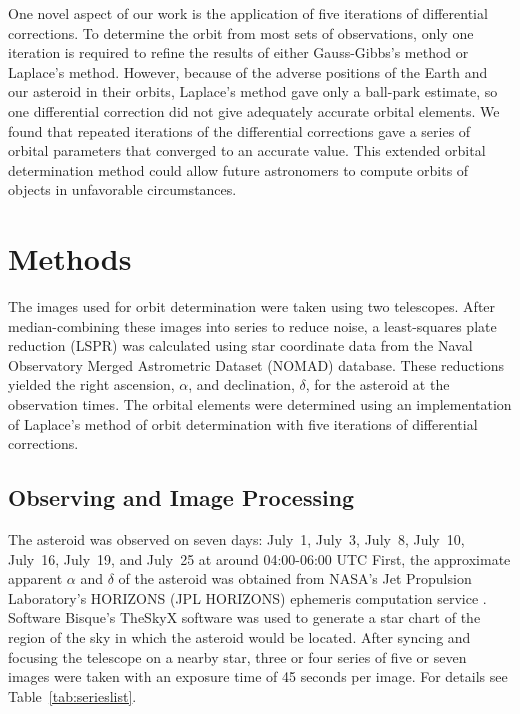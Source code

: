 \documentclass[12pt,journal,compsoc]{IEEEtran}
\begin{document}
One novel aspect of our work is the application of five iterations of differential corrections. 
To determine the orbit from most sets
of observations, only one iteration is required to refine the results of either Gauss-Gibbs's method or Laplace's method.
However, because of the adverse positions of the Earth and our asteroid in their orbits, Laplace's method
gave only a ball-park estimate, so one differential correction did not give adequately accurate orbital elements.
We found that repeated iterations of the differential corrections gave a series of orbital parameters that converged
to an accurate value. This extended orbital determination method could allow future astronomers to
compute orbits of objects in unfavorable circumstances.

\section{Methods}
The images used for orbit determination were taken using two telescopes.
After median-combining these images into series to reduce noise, 
a least-squares plate reduction (LSPR) was calculated
using star coordinate data from the Naval Observatory Merged Astrometric Dataset (NOMAD) database. 
These reductions yielded the right ascension, $\alpha$, and declination, $\delta$, for the asteroid at the observation times.
The orbital elements were determined using an implementation of Laplace's method of orbit determination with five iterations of differential corrections.

\subsection{Observing and Image Processing}
The asteroid was observed on seven days: July~1, July~3, July~8, July~10, July~16, July~19, and July~25 at around 04:00-06:00 UTC
First, 
the approximate apparent $\alpha$ and $\delta$ of the asteroid was obtained from NASA's Jet Propulsion Laboratory's HORIZONS (JPL HORIZONS) ephemeris computation service .
Software Bisque's TheSkyX software was used to generate a star chart of the region of the sky in which the asteroid would be located.
After syncing and focusing the telescope on a nearby star, three or four series of five or seven images were taken with an exposure time of 45 seconds per image. For details see Table~\ref{tab:serieslist}.
\end{document}
